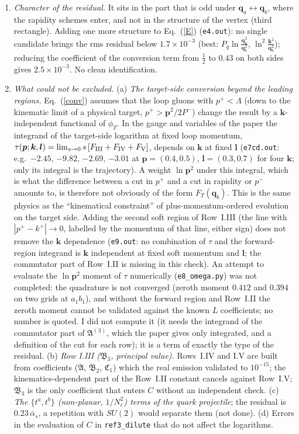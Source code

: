 \documentclass[11pt,a4paper]{article}
\renewcommand{\v}[1]{\bm{#1}}
\newcommand{\ab}{\bar\alpha_s}
\begin{document}
\begin{enumerate}
\item \emph{Character of the residual.} It sits in the part that is odd under $\v q_a\leftrightarrow\v q_b$, where the rapidity schemes enter, and not in the structure of the vertex (third rectangle). Adding one more structure to Eq.~(\ref{E}) (\texttt{e4.out}): no single candidate brings the rms residual below $1.7\times10^{-3}$ (best: $P_q\ln\frac{\v q_a^2}{\v q_b^2}$, $\ln^2\frac{\v k^2}{\v q_b^2}$); reducing the coefficient of the conversion term from $\frac12$ to $0.43$ on both sides gives $2.5\times10^{-3}$. No clean identification.
\item \emph{What could not be excluded.}
(a) \emph{The target-side conversion beyond the leading regions.} Eq.~(\ref{conv}) assumes that the loop gluons with $p^+<\Lambda$ (down to the kinematic limit of a physical target, $p^+>\v p^2/2P^-$) change the result by a $\v k$-independent functional of $\phi_T$. In the gauge and variables of the paper the integrand of the target-side logarithm at fixed loop momentum, $\tau(\v p;\v k,\v l)=\lim_{s\to0}s\,[F_{\rm III}+F_{\rm IV}+F_{\rm V}]$, depends on $\v k$ at fixed $\v l$ (\texttt{e7cd.out}: e.g.\ $-2.45$, $-9.82$, $-2.69$, $-3.01$ at $\v p=(0.4,0.5)$, $\v l=(0.3,0.7)$ for four $\v k$; only its integral is the trajectory). A weight $\ln\v p^2$ under this integral, which is what the difference between a cut in $p^+$ and a cut in rapidity or $p^-$ amounts to, is therefore not obviously of the form $F_T(\v q_b)$. This is the same physics as the ``kinematical constraint'' of plus-momentum-ordered evolution on the target side. Adding the second soft region of Row~I.III (the line with $|p^+-k^+|\to0$, labelled by the momentum of that line, either sign) does not remove the $\v k$ dependence (\texttt{e9.out}: no combination of $\tau$ and the forward-region integrand is $\v k$ independent at fixed soft momentum and $\v l$; the commutator part of Row~I.II is missing in this check). An attempt to evaluate the $\ln\v p^2$ moment of $\tau$ numerically (\texttt{e8\_omega.py}) was not completed: the quadrature is not converged (zeroth moment $0.412$ and $0.394$ on two grids at $a_1b_1$), and without the forward region and Row~I.II the zeroth moment cannot be validated against the known $L$ coefficients; no number is quoted. I did not compute it (it needs the integrand of the commutator part of $\mathfrak A^{(3)}$, which the paper gives only integrated, and a definition of the cut for each row); it is a term of exactly the type of the residual.
(b) \emph{Row I.III ($\mathfrak B_3$, principal value).} Rows~I.IV and I.V are built from coefficients ($\mathfrak A$, $\mathfrak B_2$, $\mathfrak C_1$) which the real emission validated to $10^{-15}$; the kinematics-dependent part of the Row~I.II constant cancels against Row~I.V; $\mathfrak B_3$ is the only coefficient that enters $C$ without an independent check.
(c) \emph{The $\{t^a,t^b\}$ (non-planar, $1/N_c^2$) terms of the quark projectile}; the residual is $0.23\,\ab$, a repetition with $SU(2)$ would separate them (not done).
(d) Errors in the evaluation of $C$ in \texttt{ref3\_dilute} that do not affect the logarithms.
\end{enumerate}
\end{document}
